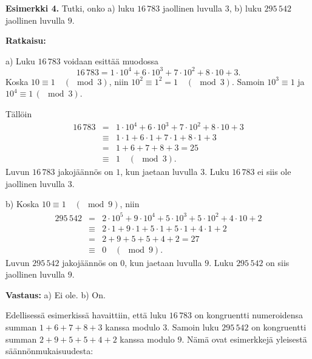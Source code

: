 {\bf Esimerkki 4.} Tutki, onko a) luku $16\, 783$ jaollinen luvulla $3$, b) luku $295\, 542$ jaollinen luvulla $9$.

{\bf Ratkaisu:}

a)
Luku $16\, 783$ voidaan esittää muodossa
\[
16\, 783 = 1 \cdot 10^4 + 6 \cdot 10^3 + 7 \cdot 10^2 + 8 \cdot 10 + 3.
\]
Koska $10 \equiv 1 \quad(\mod 3)$, niin %
$10^2 \equiv 1^2 = 1 \quad (\mod 3)$. Samoin $10^3 \equiv 1$ ja $10^4 \equiv 1 \,(\mod 3)$.

Tällöin %
\begin{eqnarray*}
16\, 783 &=& 1 \cdot 10^4 + 6 \cdot 10^3 + 7 \cdot 10^2 + 8 \cdot 10 + 3\\
&\equiv& 1\cdot 1 + 6\cdot 1 + 7\cdot 1 + 8\cdot 1 + 3%
\\
&=& 1 + 6 + 7 + 8 + 3 = 25 \\
&\equiv& 1 \quad(\mod 3).
\end{eqnarray*}
Luvun $16\, 783$ jakojäännös on $1$, kun jaetaan luvulla $3$. Luku $16\, 783$ ei siis ole jaollinen luvulla $3$.

b) 
Koska $10 \equiv 1 \quad(\mod 9)$, niin 
\begin{eqnarray*}
295\, 542 &=& 2 \cdot 10^5 + 9 \cdot 10^4 + 5 \cdot 10^3 + 5 \cdot 10^2 + 4 \cdot 10 + 2\\
&\equiv& 2\cdot 1 + 9\cdot 1 + 5\cdot 1 + 5\cdot 1 + 4\cdot 1 + 2%
\\
&=& 2 + 9 + 5 + 5 + 4 + 2 = 27 \\
&\equiv& 0 \quad(\mod 9).
\end{eqnarray*}
Luvun $295\, 542$ jakojäännös on $0$, kun jaetaan luvulla $9$. Luku $295\, 542$ on siis jaollinen luvulla $9$.

{\bf Vastaus:} a) Ei ole. b) On.

Edellisessä esimerkissä havaittiin, että luku $16\, 783$ on kongruentti numeroidensa
summan $1 + 6 + 7 + 8 + 3$ kanssa modulo $3$. Samoin luku $295\, 542$  on kongruentti
summan $2 + 9 + 5 + 5+4+2$ kanssa modulo $9$. Nämä ovat esimerkkejä yleisestä
säännönmukaisuudesta:



